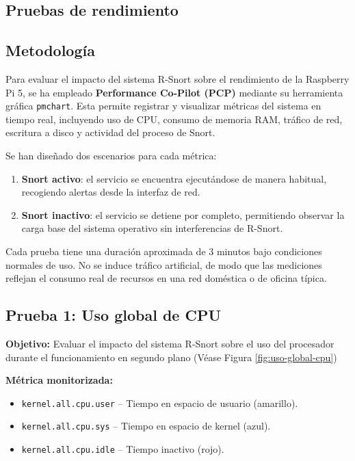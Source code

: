 \documentclass[11pt,a4paper,twoside]{report}
\begin{document}
\subsection{Pruebas de rendimiento}

\subsection*{Metodología}

Para evaluar el impacto del sistema R-Snort sobre el rendimiento de la Raspberry Pi 5, se ha empleado \textbf{Performance Co-Pilot (PCP)}\cite{pcp_project} mediante su herramienta gráfica \texttt{pmchart}. Esta permite registrar y visualizar métricas del sistema en tiempo real, incluyendo uso de CPU, consumo de memoria RAM, tráfico de red, escritura a disco y actividad del proceso de Snort.\newline

Se han diseñado dos escenarios para cada métrica:
\begin{enumerate}
	\item \textbf{Snort activo}: el servicio se encuentra ejecutándose de manera habitual, recogiendo alertas desde la interfaz de red.
	\item \textbf{Snort inactivo}: el servicio se detiene por completo, permitiendo observar la carga base del sistema operativo sin interferencias de R-Snort.
\end{enumerate}

Cada prueba tiene una duración aproximada de 3 minutos bajo condiciones normales de uso. No se induce tráfico artificial, de modo que las mediciones reflejan el consumo real de recursos en una red doméstica o de oficina típica.

\bigskip

\subsection*{Prueba 1: Uso global de CPU}

\textbf{Objetivo:}  
Evaluar el impacto del sistema R-Snort sobre el uso del procesador durante el funcionamiento en segundo plano (Véase Figura \ref{fig:uso-global-cpu})\newline

\textbf{Métrica monitorizada:}
\begin{itemize}
	\item \texttt{kernel.all.cpu.user} – Tiempo en espacio de usuario (amarillo).
	\item \texttt{kernel.all.cpu.sys} – Tiempo en espacio de kernel (azul).
	\item \texttt{kernel.all.cpu.idle} – Tiempo inactivo (rojo).
\end{itemize}
\end{document}
